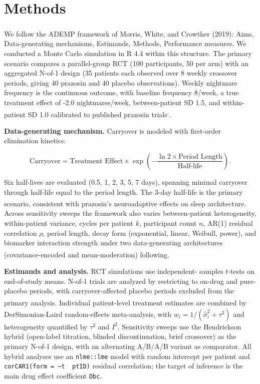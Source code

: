 \documentclass[
  11pt,
]{article}
\begin{document}
\section{Methods}\label{methods}

We follow the ADEMP framework of Morris, White, and Crowther
(2019)\textsuperscript{}: Aims, Data-generating mechanisms,
Estimands, Methods, Performance measures. We conducted a Monte
Carlo simulation in R 4.4 within this structure.
The primary scenario compares a parallel-group RCT (100
participants, 50 per arm) with an aggregated N-of-1 design
(35 patients each observed
over 8 weekly crossover periods,
giving 40 prazosin and 40 placebo observations). Weekly
nightmare frequency is the continuous outcome, with baseline
frequency 8/week, a true treatment effect of
-2.0 nightmares/week, between-patient
SD 1.5, and within-patient SD 1.0 calibrated to published
prazosin trials\textsuperscript{,}.

\textbf{Data-generating mechanism.} Carryover is modeled with
first-order elimination kinetics:

\[\text{Carryover} =
  \text{Treatment Effect}\times
  \exp\!\left(-\frac{\ln 2 \times
  \text{Period Length}}{\text{Half-life}}\right).\]

Six half-lives are evaluated (0.5, 1, 2, 3, 5, 7 days), spanning
minimal carryover through half-life equal to the period length.
The 3-day half-life is the primary scenario, consistent with
prazosin's neuroadaptive effects on sleep architecture\textsuperscript{}. Across sensitivity sweeps the framework
also varies between-patient heterogeneity, within-patient
variance, cycles per patient \(k\), participant count \(n\), AR(1)
residual correlation \(\rho\), period length, decay form
(exponential, linear, Weibull, power), and biomarker interaction
strength under two data-generating architectures
(covariance-encoded and mean-moderation) following\textsuperscript{}.

\textbf{Estimands and analysis.} RCT simulations use independent-
samples \(t\)-tests on end-of-study means. N-of-1 trials are
analyzed by restricting to on-drug and pure-placebo periods, with
carryover-affected placebo periods excluded from the primary
analysis\textsuperscript{}. Individual
patient-level treatment estimates are combined by
DerSimonian-Laird random-effects meta-analysis\textsuperscript{}, with
\(w_{i} = 1/(\hat{\sigma}_{i}^{2} + \tau^{2})\) and heterogeneity
quantified by \(\tau^{2}\) and \(I^{2}\). Sensitivity sweeps use
the Hendrickson hybrid (open-label titration, blinded
discontinuation, brief crossover) as the primary N-of-1 design,
with an alternating A/B/A/B variant as comparator. All hybrid
analyses use an \texttt{nlme::lme} model with random intercept per
patient and \texttt{corCAR1(form\ =\ \textasciitilde{}t\ \textbar{}\ ptID)} residual correlation;
the target of inference is the main drug effect coefficient
\texttt{Dbc}.
\end{document}
